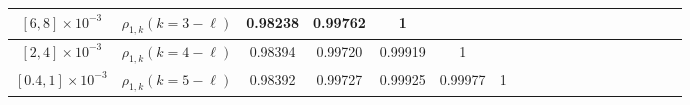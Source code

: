 \begin{table}[ht]
{\begin{tabular}{|c|c|c|c|c|c|c|c|c|c|c|c|c|c|c|c|c|c|c|}
\multirow{1}{*}{$[6, 8]\times 10^{-3}$}&\multicolumn{1}{|c|}{$\rho_{1,k} (k=3-\ell)$}&0.98238&0.99762&1&\multicolumn{3}{c|}{}\\
\hline
\multirow{1}{*}{$[2,4]\times 10^{-3}$}&\multicolumn{1}{|c|}{$\rho_{1,k} (k=4-\ell)$}&0.98394&0.99720 &0.99919&1&\multicolumn{2}{c|}{}\\
\hline
\multirow{1}{*}{$[0.4,1]\times 10^{-3}$} &\multicolumn{1}{|c|}{$\rho_{1,k} (k=5-\ell)$}&0.98392 &0.99727 &0.99925 &0.99977&1 &\\
\hline

\end{tabular}}
\end{table}
